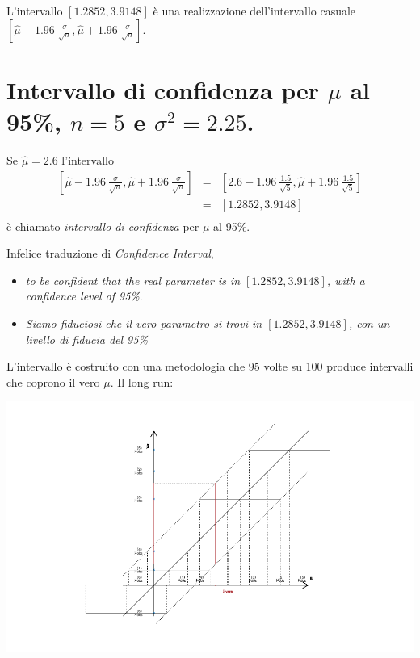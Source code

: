 \documentclass[
  11pt,
]{book}
\providecommand{\tightlist}{%
  \setlength{\itemsep}{0pt}\setlength{\parskip}{0pt}}
\theoremstyle{mytheoremstyle}
\theoremstyle{mydefstyle}
\newenvironment{nota}
  {
\begin{tcolorbox}[enhanced,breakable,arc=0.1mm,boxrule=1pt,colback=white,colframe=iblue,title=\bf \fontfamily{lmss}\selectfont \faInfoCircle \hspace{.5 cm} Nota,drop fuzzy shadow]
}{
\end{tcolorbox}
  }
\begin{document}
L'intervallo \(\left[1.2852,3.9148\right]\) è una realizzazione dell'intervallo casuale \(\left[\hat \mu- 1.96~\frac\sigma{\sqrt n},\hat \mu+ 1.96~\frac\sigma{\sqrt n}\right]\).

\section{\texorpdfstring{Intervallo di confidenza per \(\mu\) al 95\%, \(n=5\) e \(\sigma^2=2.25\).}{Intervallo di confidenza per \textbackslash mu al 95\%, n=5 e \textbackslash sigma\^{}2=2.25.}}\label{intervallo-di-confidenza-per-mu-al-95-n5-e-sigma22.25.}

Se \(\hat \mu = 2.6\) l'intervallo
\begin{eqnarray*}
 \left[\hat \mu- 1.96~\frac\sigma{\sqrt n},\hat \mu+ 1.96~\frac\sigma{\sqrt n}\right] &=& 
\left[2.6- 1.96~\frac{1.5}{\sqrt 5},\hat \mu+ 1.96~\frac{1.5}{\sqrt 5}\right]\\
 &=& \left[1.2852,3.9148\right]\\
\end{eqnarray*}
è chiamato \emph{intervallo di confidenza} per \(\mu\) al 95\%.

\begin{nota}

Infelice traduzione di \emph{Confidence Interval},

\begin{itemize}
\tightlist
\item
  \emph{to be confident that the real parameter is in \(\left[1.2852,3.9148\right]\), with a confidence level of 95\%}.
\item
  \emph{Siamo fiduciosi che il vero parametro si trovi in \(\left[1.2852,3.9148\right]\), con un livello di fiducia del 95\%}
\end{itemize}

\end{nota}

L'intervallo è costruito con una metodologia che 95 volte su 100 produce intervalli che coprono il vero \(\mu\).
Il long run:

\begin{center}\includegraphics{Appunti_di_Statistica_2025_files/figure-latex/13-stima-intervallare-12-1} \end{center}
\end{document}
